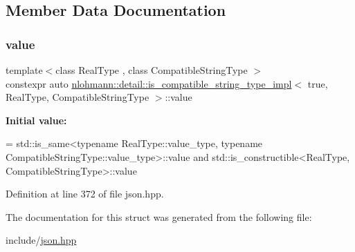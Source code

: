 \subsection{Member Data Documentation}
\mbox{\label{structnlohmann_1_1detail_1_1is__compatible__string__type__impl_3_01true_00_01_real_type_00_01_compatible_string_type_01_4_ad608328215f6221af6b7eb66548b119c}} 
\subsubsection{\texorpdfstring{value}{value}}
{\footnotesize\ttfamily template$<$class Real\+Type , class Compatible\+String\+Type $>$ \\
constexpr auto \hyperlink{structnlohmann_1_1detail_1_1is__compatible__string__type__impl}{nlohmann\+::detail\+::is\+\_\+compatible\+\_\+string\+\_\+type\+\_\+impl}$<$ true, Real\+Type, Compatible\+String\+Type $>$\+::value\hspace{0.3cm}{\ttfamily [static]}}

{\bfseries Initial value\+:}
\begin{DoxyCode}
=
        std::is\_same<typename RealType::value\_type, typename CompatibleStringType::value\_type>::value and
        std::is\_constructible<RealType, CompatibleStringType>::value
\end{DoxyCode}


Definition at line 372 of file json.\+hpp.



The documentation for this struct was generated from the following file\+:\begin{DoxyCompactItemize}
\item 
include/\hyperlink{json_8hpp}{json.\+hpp}\end{DoxyCompactItemize}
